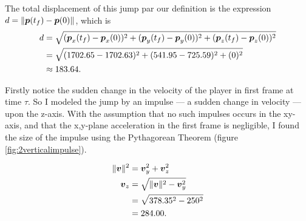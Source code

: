 The total displacement of this jump par our definition is the expression $d = \|\boldsymbol{p}(t_f) - \boldsymbol{p}(0)\|$, which is
\begin{align*}
    d &= \sqrt{(\boldsymbol{p}_x(t_f) - \boldsymbol{p}_x(0))^2 + (\boldsymbol{p}_y(t_f) - \boldsymbol{p}_y(0))^2 + (\boldsymbol{p}_z(t_f) - \boldsymbol{p}_z(0))^2}\\
    &= \sqrt{(1702.65-1702.63)^2 + (541.95-725.59)^2 + (0)^2}\\
    &\approx 183.64.
\end{align*}

Firstly notice the sudden change in the velocity of the player in first frame at time $\tau$. So I modeled the jump by an impulse --- a sudden change in velocity --- upon the z-axis. With the assumption that no such impulses occurs in the xy-axis, and that the x,y-plane acceleration in the first frame is negligible, I found the size of the impulse using the Pythagorean Theorem (figure \ref{fig:2verticalimpulse}).

\begin{align*}
    \|\boldsymbol{v}\|^2 &= \boldsymbol{v}_y^2 + \boldsymbol{v}_z^2\\
    \boldsymbol{v}_z &= \sqrt{\|\boldsymbol{v}\|^2 - \boldsymbol{v}_y^2}\\
    &= \sqrt{378.35^2 -250^2}\\
    &= 284.00.
\end{align*}

